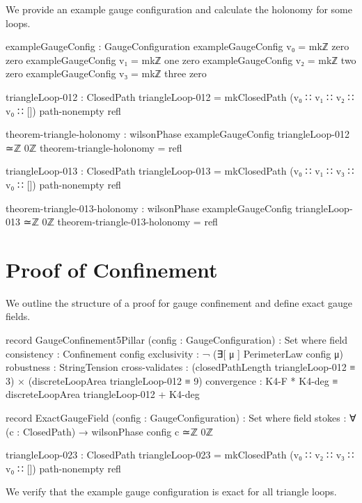 \documentclass[11pt,a4paper]{book}
\begin{document}
We provide an example gauge configuration and calculate the holonomy for some loops.

\begin{code}
exampleGaugeConfig : GaugeConfiguration
exampleGaugeConfig v₀ = mkℤ zero zero
exampleGaugeConfig v₁ = mkℤ one zero
exampleGaugeConfig v₂ = mkℤ two zero
exampleGaugeConfig v₃ = mkℤ three zero

triangleLoop-012 : ClosedPath
triangleLoop-012 = mkClosedPath 
  (v₀ ∷ v₁ ∷ v₂ ∷ v₀ ∷ [])
  path-nonempty
  refl

theorem-triangle-holonomy : wilsonPhase exampleGaugeConfig triangleLoop-012 ≃ℤ 0ℤ
theorem-triangle-holonomy = refl

triangleLoop-013 : ClosedPath
triangleLoop-013 = mkClosedPath 
  (v₀ ∷ v₁ ∷ v₃ ∷ v₀ ∷ [])
  path-nonempty
  refl

theorem-triangle-013-holonomy : wilsonPhase exampleGaugeConfig triangleLoop-013 ≃ℤ 0ℤ
theorem-triangle-013-holonomy = refl
\end{code}

\section{Proof of Confinement}

We outline the structure of a proof for gauge confinement and define exact gauge fields.

\begin{code}
record GaugeConfinement5Pillar (config : GaugeConfiguration) : Set where
  field
    consistency     : Confinement config
    exclusivity     : ¬ (∃[ μ ] PerimeterLaw config μ)
    robustness      : StringTension
    cross-validates : (closedPathLength triangleLoop-012 ≡ 3) × (discreteLoopArea triangleLoop-012 ≡ 9)
    convergence     : K4-F * K4-deg ≡ discreteLoopArea triangleLoop-012 + K4-deg

record ExactGaugeField (config : GaugeConfiguration) : Set where
  field
    stokes : ∀ (c : ClosedPath) → wilsonPhase config c ≃ℤ 0ℤ

triangleLoop-023 : ClosedPath
triangleLoop-023 = mkClosedPath 
  (v₀ ∷ v₂ ∷ v₃ ∷ v₀ ∷ [])
  path-nonempty
  refl
\end{code}

We verify that the example gauge configuration is exact for all triangle loops.
\end{document}
